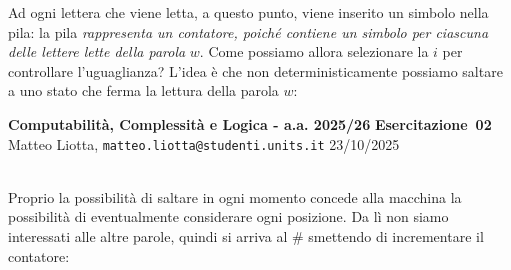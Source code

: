 \documentclass[a4paper,10pt]{article}
\makeatletter
\newcommand{\EsercitazioneNum}{02}
\newcommand{\Data}{23/10/2025}
\newcommand{\DocType}{Esercitazione} %
\newcommand{\FullTitle}{\DocType\ \EsercitazioneNum}
\newcommand{\Header}{
\noindent
  \small \textbf{Computabilità, Complessità e Logica - a.a. 2025/26} \hfill \textbf{\FullTitle} \\[0.2cm]
  \scriptsize Matteo Liotta, \texttt{matteo.liotta@studenti.units.it} \hfill \Data \\[0.2cm]
  \noindent\makebox[\linewidth]{\rule{\linewidth}{0.4pt}} \\[0.3cm]}
\newcommand{\NewPageHeader}{
  \vfill
  \noindent\makebox[\linewidth]{\rule{\linewidth}{0.4pt}}
  \newpage
  {\Header}
}
\makeatother
\begin{document}
\noindent Ad ogni lettera che viene letta, a questo punto, viene inserito un simbolo nella pila: la pila \textit{rappresenta un contatore, poiché contiene un simbolo per ciascuna delle lettere lette della parola} $w$. Come possiamo allora selezionare la $i$ per controllare l'uguaglianza? L'idea è che non deterministicamente possiamo saltare a uno stato che ferma la lettura della parola $w$:

\NewPageHeader


    {
    \small
    \begin{center}
    \end{center}
    }

\noindent Proprio la possibilità di saltare in ogni momento concede alla macchina la possibilità di eventualmente considerare ogni posizione. Da lì non siamo interessati alle altre parole, quindi si arriva al $\#$ smettendo di incrementare il contatore:
\end{document}
